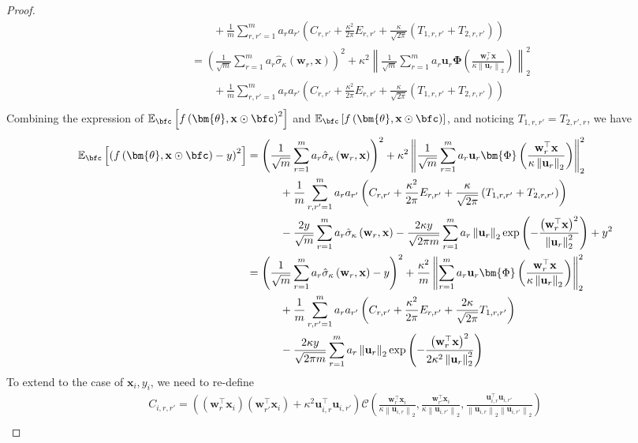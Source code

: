 \documentclass[10pt]{article} %
\theoremstyle{definition}
\theoremstyle{plain}
\newcommand{\paren}[1]{\left(#1\right)}
\newcommand{\norm}[1]{\left\|#1\right\|}
\newcommand{\act}[2]{\hat{\sigma}_{\kappa}\paren{#1,#2}}
\providecommand{\E}{\mathbb{E}}
\def\bfu{{\mathbf{u}}}\def\bfv{{\mathbf{v}}}\def\bfw{{\mathbf{w}}}\def\bfx{{\mathbf{x}}}
\begin{document}
\begin{proof}
\begin{align*}
        & \quad\quad\quad\quad + \frac{1}{m}\sum_{r,r'=1}^ma_ra_{r'}\paren{C_{r,r'} + \frac{\kappa^2}{2\pi}E_{r,r'} + \frac{\kappa}{\sqrt{2\pi}}\paren{T_{1,r,r'} + T_{2,r,r'}}}\\
        &\quad\quad = \paren{\frac{1}{\sqrt{m}}\sum_{r=1}^ma_r\act{\bfw_r}{\bfx}}^2 + \kappa^2\norm{\frac{1}{\sqrt{m}}\sum_{r=1}^ma_r\bfu_r\bm{\Phi}\paren{\frac{\bfw_r^\top\bfx}{\kappa\norm{\bfu_r}_2}}}_2^2\\
        & \quad\quad\quad\quad + \frac{1}{m}\sum_{r,r'=1}^ma_ra_{r'}\paren{C_{r,r'} + \frac{\kappa^2}{2\pi}E_{r,r'} + \frac{\kappa}{\sqrt{2\pi}}\paren{T_{1,r,r'} + T_{2,r,r'}}}\\
    \end{align*}
    Combining the expression of $\E_{\bfc}\left[f\paren{\bm{\theta},\bfx\odot\bfc}^2\right]$ and $\E_{\bfc}\left[f\paren{\bm{\theta},\bfx\odot\bfc}\right]$, and noticing $T_{1,r,r'} = T_{2,r',r}$, we have
    \begin{align*}
        \E_{\bfc}\left[\paren{f\paren{\bm{\theta},\bfx\odot\bfc} - y}^2\right] & = \paren{\frac{1}{\sqrt{m}}\sum_{r=1}^ma_r\act{\bfw_r}{\bfx}}^2 + \kappa^2\norm{\frac{1}{\sqrt{m}}\sum_{r=1}^ma_r\bfu_r\bm{\Phi}\paren{\frac{\bfw_r^\top\bfx}{\kappa\norm{\bfu_r}_2}}}_2^2\\
        & \quad\quad\quad + \frac{1}{m}\sum_{r,r'=1}^ma_ra_{r'}\paren{C_{r,r'} + \frac{\kappa^2}{2\pi}E_{r,r'} + \frac{\kappa}{\sqrt{2\pi}}\paren{T_{1,r,r'} + T_{2,r,r'}}}\\
        &\quad\quad\quad - \frac{2y}{\sqrt{m}}\sum_{r=1}^ma_r\act{\bfw_r}{\bfx} - \frac{2\kappa y}{\sqrt{2\pi m}}\sum_{r=1}^ma_r\norm{\bfu_r}_2\exp\paren{-\frac{\paren{\bfw_r^\top\bfx}^2}{\norm{\bfu_r}_2^2}} + y^2\\
        & = \paren{\frac{1}{\sqrt{m}}\sum_{r=1}^ma_r\act{\bfw_r}{\bfx} - y}^2 +  \frac{\kappa^2}{m}\norm{\sum_{r=1}^ma_r\bfu_r\bm{\Phi}\paren{\frac{\bfw_r^\top\bfx}{\kappa\norm{\bfu_r}_2}}}_2^2\\
        & \quad\quad\quad + \frac{1}{m}\sum_{r,r'=1}^ma_ra_{r'}\paren{C_{r,r'} + \frac{\kappa^2}{2\pi}E_{r,r'} + \frac{2\kappa}{\sqrt{2\pi}}T_{1,r,r'}}\\
        &\quad\quad\quad - \frac{2\kappa y}{\sqrt{2\pi m}}\sum_{r=1}^ma_r\norm{\bfu_r}_2\exp\paren{-\frac{\paren{\bfw_r^\top\bfx}^2}{2\kappa^2\norm{\bfu_r}_2^2}}
    \end{align*}
    To extend to the case of $\bfx_i,y_i$, we need to re-define
    \begin{gather*}
        C_{i,r,r'} = \paren{\paren{\bfw_r^\top\bfx_i}\paren{\bfw_{r'}^\top\bfx_i} + \kappa^2\bfu_{i,r}^\top\bfu_{i,r'}}\mathcal{C}\paren{\frac{\bfw_r^\top\bfx_i}{\kappa\norm{\bfu_{i,r}}_2},\frac{\bfw_{r'}^\top\bfx_i}{\kappa\norm{\bfu_{i,r'}}_2},\frac{\bfu_{i,r}^\top\bfu_{i,r'}}{\norm{\bfu_{i,r}}_2\norm{\bfu_{i,r'}}_2}}\\

\end{gather*}
\end{proof}
\end{document}

